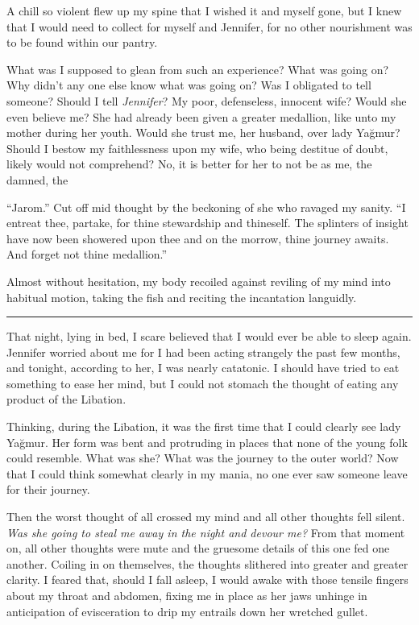 A chill so violent flew up my spine that I wished it and myself gone, but I knew that I would need
to collect for myself and Jennifer, for no other nourishment was to be found within our pantry.

What was I supposed to glean from such an experience? What was going on? Why didn't any one else
know what was going on? Was I obligated to tell someone? Should I tell \textit{Jennifer}? My poor,
defenseless, innocent wife? Would she even believe me? She had already been given a greater
medallion, like unto my mother during her youth. Would she trust me, her husband, over lady Yağmur?
Should I bestow my faithlessness upon my wife, who being destitue of doubt, likely would not
comprehend? No, it is better for her to not be as me, the damned, the 

``Jarom.'' Cut off mid thought by the beckoning of she who ravaged my sanity. ``I entreat thee,
partake, for thine stewardship and thineself. The splinters of insight have now been showered upon
thee and on the morrow, thine journey awaits. And forget not thine medallion.''

Almost without hesitation, my body recoiled against reviling of my mind into habitual motion, taking
the fish and reciting the incantation languidly.

\noindent\rule{\textwidth}{1pt}

That night, lying in bed, I scare believed that I would ever be able to sleep again. Jennifer
worried about me for I had been acting strangely the past few months, and tonight, according to her,
I was nearly catatonic. I should have tried to eat something to ease her mind, but I could not
stomach the thought of eating any product of the Libation.

Thinking, during the Libation, it was the first time that I could clearly see lady Yağmur. Her form
was bent and protruding in places that none of the young folk could resemble. What was she? What was
the journey to the outer world? Now that I could think somewhat clearly in my mania, no one ever saw
someone leave for their journey.

Then the worst thought of all crossed my mind and all other thoughts fell silent. \textit{Was she
going to steal me away in the night and devour me?} From that moment on, all other thoughts were
mute and the gruesome details of this one fed one another. Coiling in on themselves, the thoughts
slithered into greater and greater clarity. I feared that, should I fall asleep, I would awake with
those tensile fingers about my throat and abdomen, fixing me in place as her jaws unhinge in
anticipation of evisceration to drip my entrails down her wretched gullet.

